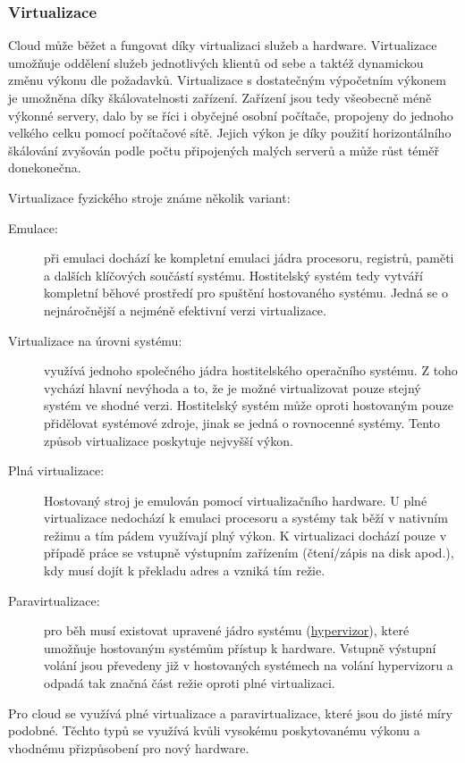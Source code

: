 \subsubsection{Virtualizace}
\label{sec:virtualizace}
Cloud může běžet a fungovat díky virtualizaci služeb a hardware. Virtualizace umožňuje oddělení služeb jednotlivých klientů od sebe a taktéž dynamickou změnu výkonu dle požadavků. Virtualizace s dostatečným výpočetním výkonem je umožněna díky škálovatelnosti zařízení. Zařízení jsou tedy všeobecně méně výkonné servery, dalo by se říci i obyčejné osobní počítače, propojeny do jednoho velkého celku pomocí počítačové sítě. Jejich výkon je díky použití horizontálního škálování zvyšován podle počtu připojených malých serverů a může růst téměř donekonečna.

Virtualizace fyzického stroje známe několik variant\cite{zive.cz:virtualizace}:
\begin{description}
	\item[Emulace:] při emulaci dochází ke kompletní emulaci jádra procesoru, registrů, paměti a dalších klíčových součástí systému. Hostitelský systém tedy vytváří kompletní běhové prostředí pro spuštění hostovaného systému. Jedná se o nejnáročnější a nejméně efektivní verzi virtualizace.
	\item[Virtualizace na úrovni systému:] využívá jednoho společného jádra hostitelského operačního systému. Z toho vychází hlavní nevýhoda a to, že je možné virtualizovat pouze stejný systém ve shodné verzi. Hostitelský systém může oproti hostovaným pouze přidělovat systémové zdroje, jinak se jedná o rovnocenné systémy. Tento způsob virtualizace poskytuje nejvyšší výkon.
	\item[Plná virtualizace:] Hostovaný stroj je emulován pomocí virtualizačního hardware. U plné virtualizace nedochází k emulaci procesoru a systémy tak běží v nativním režimu a tím pádem využívají plný výkon. K virtualizaci dochází pouze v případě práce se vstupně výstupním zařízením (čtení/zápis na disk apod.), kdy musí dojít k překladu adres a vzniká tím režie.
	\item[Paravirtualizace:] pro běh musí existovat upravené jádro systému (\href{http://cs.wikipedia.org/wiki/Hypervizor}{hypervizor}), které umožňuje hostovaným systémům přístup k hardware. Vstupně výstupní volání jsou převedeny již v hostovaných systémech na volání hypervizoru a odpadá tak značná část režie oproti plné virtualizaci.
\end{description}
Pro cloud se využívá plné virtualizace a paravirtualizace, které jsou do jisté míry podobné. Těchto typů se využívá kvůli vysokému poskytovanému výkonu a vhodnému přizpůsobení pro nový hardware.

